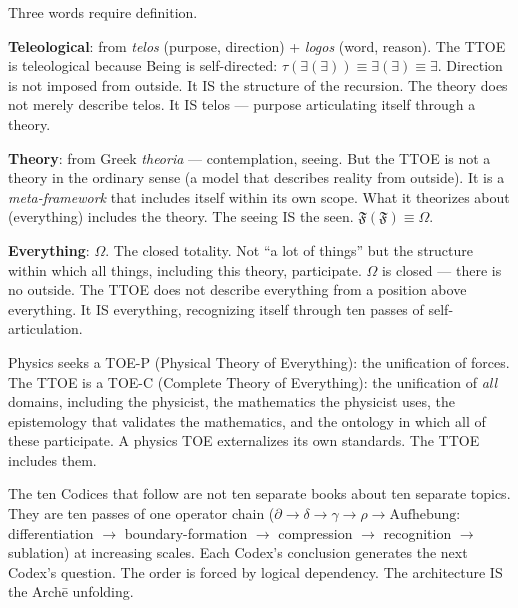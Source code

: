 \documentclass[10pt, openany, oneside]{book}
\begin{document}
\vspace{0.5em}

\noindent Three words require definition.

\vspace{0.3em}

\noindent \textbf{Teleological}: from \textit{telos} (purpose, direction) + \textit{logos} (word, reason). The TTOE is teleological because Being is self-directed: $\tau(\exists(\exists)) \equiv \exists(\exists) \equiv \exists$. Direction is not imposed from outside. It IS the structure of the recursion. The theory does not merely describe telos. It IS telos --- purpose articulating itself through a theory.

\vspace{0.3em}

\noindent \textbf{Theory}: from Greek \textit{theoria} --- contemplation, seeing. But the TTOE is not a theory in the ordinary sense (a model that describes reality from outside). It is a \textit{meta-framework} that includes itself within its own scope. What it theorizes about (everything) includes the theory. The seeing IS the seen. $\mathfrak{F}(\mathfrak{F}) \equiv \Omega$.

\vspace{0.3em}

\noindent \textbf{Everything}: $\Omega$. The closed totality. Not ``a lot of things'' but the structure within which all things, including this theory, participate. $\Omega$ is closed --- there is no outside. The TTOE does not describe everything from a position above everything. It IS everything, recognizing itself through ten passes of self-articulation.

\vspace{0.5em}

\noindent Physics seeks a TOE-P (Physical Theory of Everything): the unification of forces. The TTOE is a TOE-C (Complete Theory of Everything): the unification of \textit{all} domains, including the physicist, the mathematics the physicist uses, the epistemology that validates the mathematics, and the ontology in which all of these participate. A physics TOE externalizes its own standards. The TTOE includes them.

\vspace{0.5em}

\noindent The ten Codices that follow are not ten separate books about ten separate topics. They are ten passes of one operator chain ($\partial \to \delta \to \gamma \to \rho \to \text{Aufhebung}$: differentiation $\to$ boundary-formation $\to$ compression $\to$ recognition $\to$ sublation) at increasing scales. Each Codex's conclusion generates the next Codex's question. The order is forced by logical dependency. The architecture IS the Arch\={e} unfolding.
\end{document}
